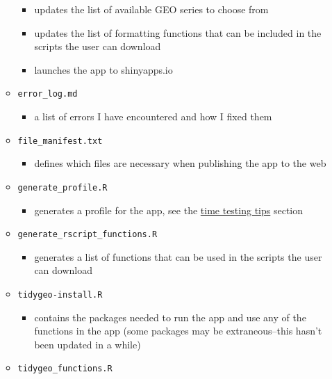 \documentclass[]{article}
\providecommand{\tightlist}{%
  \setlength{\itemsep}{0pt}\setlength{\parskip}{0pt}}
\begin{document}
\begin{itemize}
\begin{itemize}
    \begin{itemize}
    \tightlist
    \item
      updates the list of available GEO series to choose from
    \item
      updates the list of formatting functions that can be included in
      the scripts the user can download
    \item
      launches the app to shinyapps.io
    \end{itemize}
  \item
    \texttt{error\_log.md}

    \begin{itemize}
    \tightlist
    \item
      a list of errors I have encountered and how I fixed them
    \end{itemize}
  \item
    \texttt{file\_manifest.txt}

    \begin{itemize}
    \tightlist
    \item
      defines which files are necessary when publishing the app to the
      web
    \end{itemize}
  \item
    \texttt{generate\_profile.R}

    \begin{itemize}
    \tightlist
    \item
      generates a profile for the app, see the
      \protect\hyperlink{time-testing}{time testing tips} section
    \end{itemize}
  \item
    \texttt{generate\_rscript\_functions.R}

    \begin{itemize}
    \tightlist
    \item
      generates a list of functions that can be used in the scripts the
      user can download
    \end{itemize}
  \item
    \texttt{tidygeo-install.R}

    \begin{itemize}
    \tightlist
    \item
      contains the packages needed to run the app and use any of the
      functions in the app (some packages may be extraneous--this hasn't
      been updated in a while)
    \end{itemize}
  \item
    \texttt{tidygeo\_functions.R}


\end{itemize}
\end{itemize}
\end{document}
